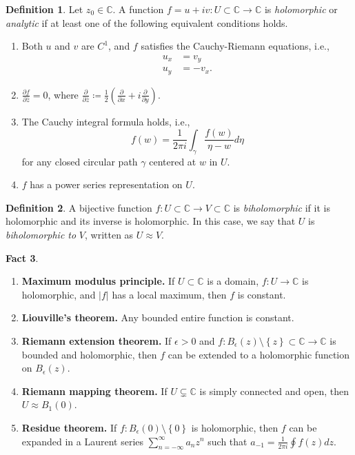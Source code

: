 \documentclass[10pt,letterpaper,cm]{nupset}
\theoremstyle{definition}
\newtheorem{defn}{Definition}[subsection]
\theoremstyle{theorem}
\newtheorem{fact}[defn]{Fact}
\theoremstyle{remark}
\newcommand{\C}{\mathbb C}
\newcommand{\1}{\mathbb{1}}
\newcommand{\0}{\vec 0}
\newcommand{\be}{\begin{enumerate}}
\newcommand{\ee}{\end{enumerate}}
\begin{document}
\begin{defn}
Let $z_0\in \C$. A function $f = u+iv : U\subset \C \to \C$ is \textit{holomorphic} or \textit{analytic} if at least one of  the following equivalent conditions holds.
\be[label=(\roman*)]
\item Both $u$ and $v$ are $C^1$, and $f$ satisfies the Cauchy-Riemann equations, i.e., 
\begin{align*}
u_x & = v_y
\\ u_y & = {-v_x}.
\end{align*}
\item $\frac{\partial{f}}{\partial{\bar{z}}} =0$, where $\frac{\partial}{\partial{\bar{z}}} \coloneqq \frac{1}{2}\left(\frac{\partial}{\partial{x}} + i\frac{\partial}{\partial{y}}\right ) .$
\item The Cauchy integral formula holds, i.e., 
\[f(w) = \frac{1}{2\pi i}\int_{\gamma}\frac{f(w)}{\eta -w}d{\eta}
\] for any closed circular path $\gamma$ centered at $w$ in $U$. 
\item $f$ has a power series representation on $U$.
\ee
\end{defn}

\smallskip

\begin{defn}
A bijective function $f: U \subset \C \to V \subset \C$ is \textit{biholomorphic} if it is holomorphic and its inverse is holomorphic. In this case, we say that $U$ is \textit{biholomorphic to} $V$, written as $U \approx V$.
\end{defn}

\begin{fact}\label{singfacts} $ $
\be[label = (\alph*)]
\item{\textbf{Maximum modulus principle.}} If $U\subset \C$ is a domain, $f: U \to \C$ is holomorphic, and $\left\lvert{f}\right\rvert$ has a local maximum, then $f$ is constant. 
\item{\textbf{Liouville's theorem.}} Any bounded entire function is constant. 
\item{\textbf{Riemann extension theorem.}} If $\epsilon >0$ and $f: B_{\epsilon}(z) \setminus \left\{z\right\} \subset \C \to \C$ is bounded and holomorphic, then $f$ can be extended to a holomorphic function on $B_{\epsilon}(z)$.
\item{\textbf{Riemann mapping theorem.}} If $U\subsetneq \C$ is simply connected and open, then $U\approx B_1(0)$. 
\item{\textbf{Residue theorem.}} If $f: B_{\epsilon}(0)\setminus \left\{0\right\}$ is holomorphic, then $f$ can be expanded in a Laurent series
$\sum_{n={-\infty}}^{\infty}a_nz^n$ such that $a_{-1} = \frac{1}{2\pi i}\oint f(z)d{z}$.
\ee
\end{fact}
\end{document}
